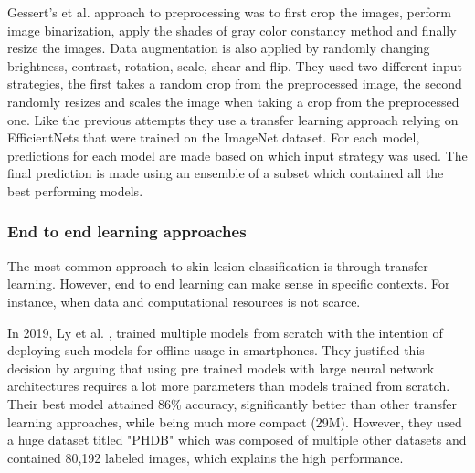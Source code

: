 \documentclass[journal,compsoc]{IEEEtran}
\begin{document}
Gessert's et al. approach to preprocessing was to first crop the images, perform image binarization, apply the shades of gray color constancy method and finally resize the images. Data augmentation is also applied by randomly changing brightness, contrast, rotation, scale, shear and flip. They used two different input strategies, the first takes a random crop from the preprocessed image, the second randomly resizes and scales the image when taking a crop from the preprocessed one. Like the previous attempts they use a transfer learning approach relying on EfficientNets that were trained on the ImageNet dataset. For each model, predictions for each model are made based on which input strategy was used. The final prediction is made using an ensemble of a subset which contained all the best performing models.
\subsubsection{End to end learning approaches}
The most common approach to skin lesion classification is through transfer learning. However, end to end learning can make sense in specific contexts. For instance, when data and computational resources is not scarce. \par 
In 2019, Ly et al. \cite{Ly2019}, trained multiple models from scratch with the intention of deploying such models for offline usage in smartphones. They justified this decision by arguing that using pre trained models with large neural network architectures requires a lot more parameters than models trained from scratch. Their best model attained 86\% accuracy, significantly better than other transfer learning approaches, while being much more compact (29M). However, they used a huge dataset titled "PHDB" which was composed of multiple other datasets and contained 80,192 labeled images, which explains the high performance.
%
%
\end{document}
